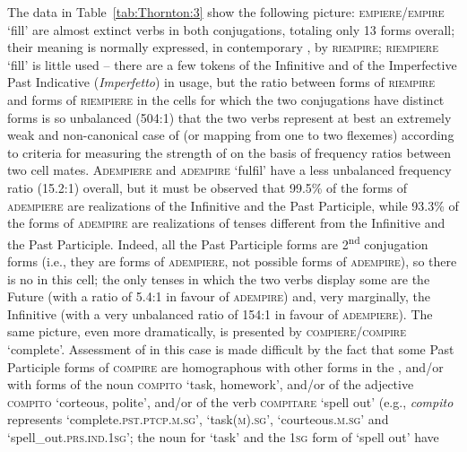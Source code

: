 \documentclass[output=paper]{langsci/langscibook}
\begin{document}
The data in Table~\ref{tab:Thornton:3} show the following picture: \textsc{empiere\slash{}empire} `fill' are almost extinct verbs in both conjugations, totaling
only 13 forms overall; their meaning is normally expressed, in
contemporary , by \textsc{riempire}; \textsc{riempiere} `fill' is
little used -- there are a few tokens of the Infinitive and of the
Imperfective Past Indicative (\emph{Imperfetto}) in usage, but the ratio
between forms of \textsc{riempire} and forms of \textsc{riempiere} in
the cells for which the two conjugations have distinct forms is so
unbalanced (504:1) that the two verbs represent at best an extremely
weak and non-canonical case of  (or mapping from one 
to two flexemes) according to %
%
criteria for
measuring the strength of  on the basis of frequency ratios
between two cell mates. \textsc{Adempiere} and \textsc{adempire}
`fulfil' have a less unbalanced frequency ratio (15.2:1) overall, but it
must be observed that 99.5\% of the forms of \textsc{adempiere} are
realizations of the Infinitive and the Past Participle, while 93.3\% of
the forms of \textsc{adempire} are realizations of tenses different from
the Infinitive and the Past Participle. Indeed, all the Past Participle
forms are 2\textsuperscript{nd} conjugation forms (i.e., they are forms
of \textsc{adempiere}, not possible forms of \textsc{adempire}), so
there is no  in this cell; the only tenses in which the two
verbs display some  are the Future (with a ratio of 5.4:1
in favour of \textsc{adempire}) and, very marginally, the Infinitive
(with a very unbalanced ratio of 154:1 in favour of \textsc{adempiere}).
The same picture, even more dramatically, is presented by
\textsc{compiere\slash{}compire} `complete'. Assessment of  in
this case is made difficult by the fact that some Past Participle forms
of \textsc{compire} are homographous with other forms in the ,
and\slash{}or with forms of the noun \textsc{compito} `task, homework', and\slash{}or of the adjective \textsc{compito} `corteous, polite', and\slash{}or of the
verb \textsc{compitare} `spell out' (e.g., \emph{compito} represents
`complete.\textsc{pst.ptcp.m.sg}', `task(\textsc{m}).\textsc{sg}',
`courteous.\textsc{m.sg}' and `spell\_out.\textsc{prs.ind.1sg}'; the
noun for `task' and the \textsc{1sg} form of `spell out' have
\end{document}
